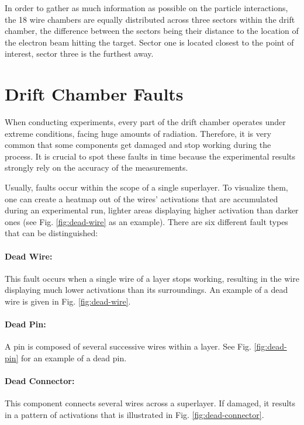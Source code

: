 In order to gather as much information as possible on the particle
interactions, the 18 wire chambers are equally distributed across
three sectors within the drift chamber, the difference between the
sectors being their distance to the location of the electron beam hitting
the target. Sector one is located closest to the point of interest,
sector three is the furthest away.

\section{Drift Chamber Faults}
\label{sec:faults}

When conducting experiments, every part of the drift chamber
operates under extreme conditions, facing huge amounts of
radiation. Therefore, it is very common that
some components get damaged and stop working during the process. It
is crucial to spot these faults in time because the experimental
results strongly rely on the accuracy of the measurements.

Usually, faults occur within the scope of a single superlayer. To
visualize them, one can create a heatmap out of the wires' activations
that are accumulated during an experimental run, lighter areas
displaying higher activation than darker ones (see
Fig. \ref{fig:dead-wire} as an example). There are six different fault
types that can be distinguished:

\paragraph{Dead Wire:}
This fault occurs when a single wire
of a layer stops working, resulting in the wire displaying much lower
activations than its surroundings. An example of a dead wire is given
in Fig. \ref{fig:dead-wire}.

\paragraph{Dead Pin:}
A pin is composed of several successive
wires within a layer. See Fig. \ref{fig:dead-pin} for
an example of a dead pin.

\paragraph{Dead Connector:}
This component connects several wires
across a superlayer. If damaged, it results in a pattern of
activations that is illustrated in Fig. \ref{fig:dead-connector}.

